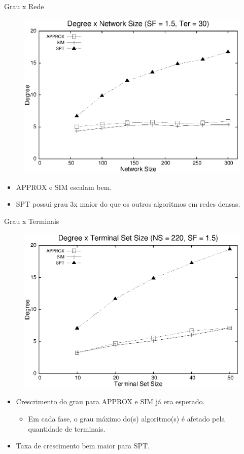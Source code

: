 \documentclass[10pt]{beamer}
\begin{document}
\begin{frame}{Grau x Rede}
\begin{figure}[H]
\centering
\includegraphics[scale=0.60]{imagens/defesa-grau_rede}
\label{fig:grau_rede}
\end{figure}
\begin{itemize}
  \item APPROX e SIM escalam bem.
  \item SPT possui grau 3x maior do que os outros algoritmos em redes densas.
\end{itemize}
\end{frame}

\begin{frame}{Grau x Terminais}
\begin{figure}[H]
\centering
\includegraphics[scale=0.60]{imagens/defesa-grau_terminal}
\label{fig:grau_terminal}
\end{figure}
\begin{itemize}
  \item Crescrimento do grau para APPROX e SIM já era esperado.
  \begin{itemize}
    \item Em cada fase, o grau máximo do(s) algoritmo(s) é afetado pela quantidade de terminais.
  \end{itemize}
  \item Taxa de crescimento bem maior para SPT.
\end{itemize}
\end{frame}
\end{document}
